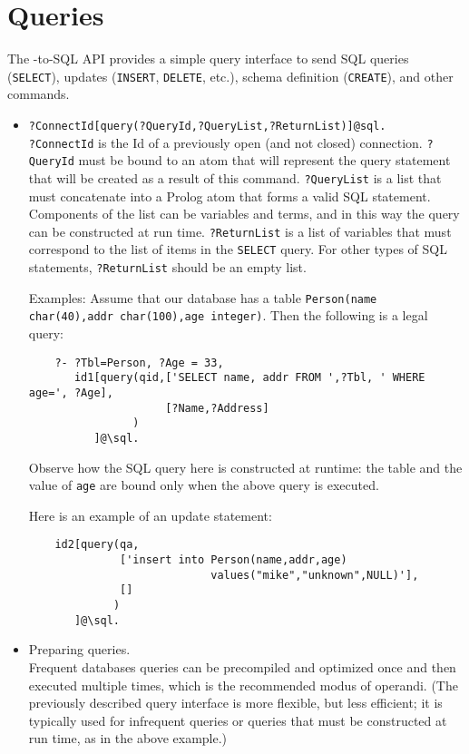 \section{Queries}

The \ERGO-to-SQL API provides a simple query interface to send SQL queries
(\texttt{SELECT}), updates (\texttt{INSERT}, \texttt{DELETE}, etc.),
schema definition
(\texttt{CREATE}),  and other commands.
\begin{itemize}
\item  \texttt{?ConnectId[query(?QueryId,?QueryList,?ReturnList)]@\bs{}sql.}
  \\
  \texttt{?ConnectId} is the Id of a previously open (and not closed)
  connection. \texttt{?QueryId} must be bound to an atom that will
  represent the query statement that will be created as a result of this
  command. \texttt{?QueryList} is a list that must concatenate into a
  Prolog atom that forms a valid
  SQL statement. Components of the list can be variables and terms, and in
  this way the query can be constructed at run time. \texttt{?ReturnList}
  is a list of variables that must correspond to the list of items in the
  \texttt{SELECT} query. For other types of SQL statements,
  \texttt{?ReturnList} should be an empty list.

  Examples: Assume that our database has a table
  \texttt{Person(name char(40),addr char(100),age integer)}. Then
  the following is a legal query:
\begin{verbatim}
    ?- ?Tbl=Person, ?Age = 33,
       id1[query(qid,['SELECT name, addr FROM ',?Tbl, ' WHERE age=', ?Age],
                     [?Name,?Address]
                )
          ]@\sql.  
\end{verbatim}
  Observe how the SQL query here is constructed at runtime: the table and the
  value of \texttt{age} are bound only when the above \ERGO query is
  executed. 

  Here is an example of an update statement:
\begin{verbatim}
    id2[query(qa,
              ['insert into Person(name,addr,age)
                            values("mike","unknown",NULL)'],
              []
             )
       ]@\sql.  
\end{verbatim}
  

\item Preparing queries.\\
  Frequent databases queries can be precompiled and optimized once and then
  executed multiple times, which is the recommended modus of operandi.
  (The previously described query interface is more flexible, but less
  efficient; it is typically used for infrequent queries or queries that
  must be constructed at run time, as in the above example.)


\end{itemize}

